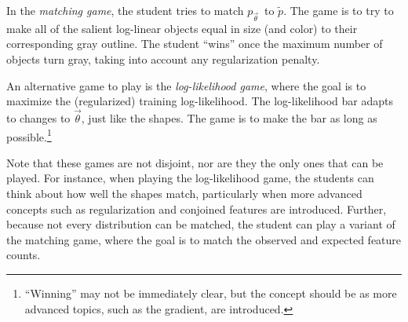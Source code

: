 \documentclass[11pt,letterpaper]{article}
\newcommand{\Note}[1]{}
\renewcommand{\Note}[1]{\hl{[#1]}}  %
\newcommand{\NoteSigned}[3]{{\sethlcolor{#2}\Note{#1: #3}}}
\newcommand{\NoteFF}[1]{\NoteSigned{FF}{LightBlue}{#1}}
\begin{document}
In the \textit{matching game}, the student tries to match $p_{\vec{\theta}}$\ to  $\tilde{p}$. 
The game is to try to make all of the salient log-linear objects 
equal in size (and color) to their corresponding gray outline. 
The student ``wins'' once the maximum number of objects turn gray, 
taking into account any regularization penalty.

An alternative game to play is the \textit{log-likelihood game}, where the goal is to
maximize the (regularized) training log-likelihood. The log-likelihood bar adapts to 
changes to $\vec{\theta}$, just like the shapes. The game is to make the bar as 
long as possible.\footnote{``Winning'' may not be immediately clear, but the concept should be 
as more advanced topics, such as the gradient, are introduced.}

Note that these games are not disjoint, nor are they the only ones that can be played.
For instance, when playing the log-likelihood game, the students can think about how well 
the shapes match, particularly when more advanced concepts such as regularization and 
conjoined features are introduced. Further, because not every distribution can be matched, 
the student can play a variant of the matching game, where the goal
is to match the observed and expected feature counts. 


\end{document}

